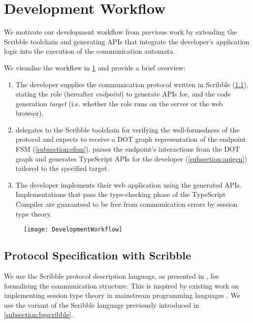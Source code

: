 \section{Development Workflow}

We motivate our development workflow from previous work 
\cite{PureScript2019, Hybrid2016} by extending the Scribble toolchain
and generating APIs that integrate the developer's 
application logic
into the execution of the communication automata.

We visualise the workflow in \cref{fig:devworkflow} 
and provide a brief overview:

\begin{enumerate}

\item The developer supplies the communication protocol written in
Scribble (\cref{subsection:scribble}), 
stating the role (hereafter \textit{endpoint})
to generate APIs for,
and the code generation \textit{target} 
(i.e. whether the role runs on the server or the web browser).

\item {} delegates to the 
Scribble toolchain for verifying the well-formedness of
the protocol and expects to receive a DOT graph representation of
the endpoint FSM (\cref{subsection:efsm}). 
 parses the endpoint's 
interactions from the DOT graph and generates TypeScript APIs
for the developer (\cref{subsection:apigen}) 
tailored to the specified target.

\item The developer implements their web application using the
generated APIs. Implementations that pass the type-checking phase
of the TypeScript Compiler are guaranteed to be free from 
communication errors by session type theory.

\end{enumerate}

\begin{figure}[!ht]
\centering
\texttt{[image: DevelopmentWorkflow]}
\label{fig:devworkflow}
\end{figure}

\subsection{Protocol Specification with Scribble}
\label{subsection:scribble}

We use the Scribble protocol description language, 
as presented in
\cite{Scribble}, for formalising the communication structure. This is
inspired by existing work on implementing session type theory 
in mainstream programming languages
\cite{Hybrid2016, PureScript2019, Python2017}. 
We use the variant of the Scribble language 
previously introduced in \cref{subsection:bgscribble}.

